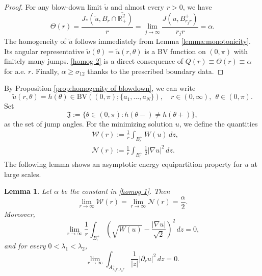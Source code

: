 \documentclass[leqno,11pt]{amsart}
\let\pa=\partial
\let\al=\alpha
\let\f=\frac
\let\T=\Theta
\let\pa=\partial
\let\na=\nabla
\newtheorem{lemma}[theorem]{Lemma}
\theoremstyle{remark}
\newcommand{\BR}{\mathbb{R}}
\newcommand{\tu}{\tilde{u}}
\begin{document}
\begin{proof}
    For any blow-down limit $\tu$ and almost every $r>0$, we have 
    \begin{equation*}
        \Theta(r)=\f{J_*(\tu,B_r\cap \overline{\BR_+^2})}{r}=\lim\limits_{j\to\infty} \f{J(u, B_{r_jr}^+)}{r_jr}=\alpha.
    \end{equation*}
    The homogeneity of $\tu$ follows immediately from Lemma \ref{lemma:monotonicity}. Its angular representative $\tu(\theta)=\tu(r,\theta)$ is a BV function on $(0,\pi)$ with finitely many jumps. \eqref{homog 2} is a direct consequence of $Q(r)\equiv \T(r)\equiv \al$ for a.e. $r$. Finally, $\al\geq \sigma_{12}$ thanks to the prescribed boundary data. 
    
\end{proof}


By Proposition \ref{prop:homogenity of blowdown}, we can write
\begin{equation*}
    \tu(r,\theta)=h(\theta) \in \mathrm{BV}((0,\pi);\{a_1,...,a_N\}), \quad r\in(0,\infty),\ \ \theta\in(0,\pi).
\end{equation*}
Set 
\[
\mathfrak{J}:=\{\theta\in(0,\pi):h(\theta-)\neq h(\theta+)\},
\]
as the set of jump angles. For the minimizing solution $u$, we define the quantities
    \begin{align*}
        &\mathcal{W}(r):= \f{1}{r}\int_{B_r^+} W(u)\,dz,\\
        &\mathcal{N}(r):=\f{1}{r}\int_{B_r^+} \f12 |\na u|^2\,dz.
    \end{align*}
The following lemma shows an asymptotic energy equipartition property for $u$ at large scales.

\begin{lemma}\label{lem:ene equip}
    Let $\al$ be the constant in \eqref{homog 1}. Then
    \begin{equation}\label{lim: W N}
    \lim\limits_{r\to\infty} \mathcal{W}(r)= \lim\limits_{r\to\infty} \mathcal{N}(r)=\f{\al}{2}. 
    \end{equation}
    Moreover, 
    \begin{equation}\label{lim: ene equip}
        \lim\limits_{r\to\infty} \f{1}{r} \int_{B_r^+}\left(\sqrt{W(u)}-\f{|\na u|}{\sqrt 2}\right)^2\,dz =0,
    \end{equation}
    and for every $0<\lambda_1<\lambda_2$,
    \begin{equation}\label{lim: small rad der}
        \lim\limits_{r\to\infty} \int_{A_{\lambda_1r,\lambda_2r}^+} \f{1}{|z|}|\pa_r u|^2\,dz=0.
    \end{equation}
\end{lemma}
\end{document}
